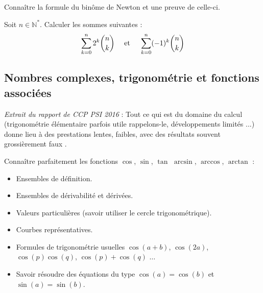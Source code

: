 \documentclass[a4paper,twoside,french,10pt]{VcCours}
\begin{document}
\begin{ptc}{}
	Connaître la formule du binôme de Newton et une preuve de celle-ci.
\end{ptc}


%


\medskip

\begin{Exercice}{}\end{Exercice} Soit $n \in \mathbb{N}^*$. Calculer les sommes suivantes : 
$$ \sum_{k=0}^n 2^k \binom{n}{k} \quad \hbox{ et } \quad \sum_{k=0}^n (-1)^k \binom{n}{k}$$

\medskip

\subsection{Nombres complexes, trigonométrie et fonctions associées}

\medskip 

\textit{Extrait du rapport de CCP PSI 2016} : \og Tout ce qui est du domaine du calcul (trigonométrie élémentaire parfois utile rappelons-le, développements limités ...) donne lieu à des prestations lentes, faibles, avec des résultats souvent grossièrement faux \fg .

\medskip

\begin{ptc}{}
	Connaître parfaitement les fonctions $\cos$, $\sin$, $\tan$ $\arcsin$, $\arccos$, $\arctan$ :
\begin{itemize}
\item Ensembles de définition.
\item Ensembles de dérivabilité et dérivées. 
\item Valeurs particulières (savoir utiliser le cercle trigonométrique).
\item Courbes représentatives.
\item Formules de trigonométrie usuelles $\cos(a+b)$, $\cos(2a)$, $\cos(p)\cos(q)$, $\cos(p)+\cos(q)$ $\ldots$
\item Savoir résoudre des équations du type $\cos(a)= \cos(b)$ et $\sin(a)=\sin(b)$.
\end{itemize}
\end{ptc}
%
\end{document}
